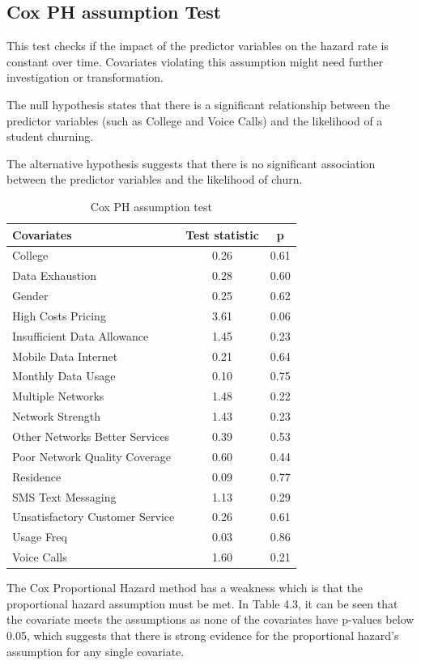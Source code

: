 \documentclass[doublespacing]{report} %
\begin{document}
\subsection{\textbf{Cox PH assumption Test}
}
This test checks if the impact of the predictor variables on the hazard rate is constant over time. Covariates violating this assumption might need further investigation or transformation.	

The null hypothesis states that there is a significant relationship between the predictor variables (such as College and Voice Calls) and the likelihood of a student churning.

The alternative hypothesis suggests that there is no significant association between the predictor variables and the likelihood of churn.


\begin{table}[H]
\centering
\begin{tabular}{lcc}
\toprule
\textbf{Covariates} & \textbf{Test statistic} & \textbf{p} \\
\midrule
College & 0.26 & 0.61 \\
Data Exhaustion & 0.28 & 0.60 \\
Gender & 0.25 & 0.62 \\
High Costs Pricing & 3.61 & 0.06 \\
Insufficient Data Allowance & 1.45 & 0.23 \\
Mobile Data Internet & 0.21 & 0.64 \\
Monthly Data Usage & 0.10 & 0.75 \\
Multiple Networks & 1.48 & 0.22 \\
Network Strength & 1.43 & 0.23 \\
Other Networks Better Services & 0.39 & 0.53 \\
Poor Network Quality Coverage & 0.60 & 0.44 \\
Residence & 0.09 & 0.77 \\
SMS Text Messaging & 1.13 & 0.29 \\
Unsatisfactory Customer Service & 0.26 & 0.61 \\
Usage Freq & 0.03 & 0.86 \\
Voice Calls & 1.60 & 0.21 \\
\bottomrule
\end{tabular}
\caption{Cox PH assumption test}
\end{table}

The Cox Proportional Hazard method has a weakness which is that the proportional hazard assumption must be met. In Table 4.3, it can be seen that the covariate meets the assumptions as none of the covariates have p-values below 0.05, which suggests that there is strong evidence for the proportional hazard’s assumption for any single covariate.
\end{document}
